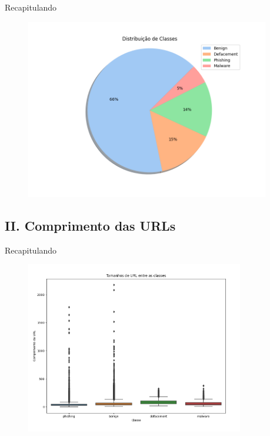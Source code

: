 \documentclass{beamer}
\begin{document}
\begin{frame}{Recapitulando}

    \begin{figure}[H]
        \centering
        \includegraphics[width=0.95\textwidth]{pic/Figure_1.png}
        \label{fig:exampleFig1}
    \end{figure}
    
\end{frame}

\subsection{II. Comprimento das URLs}

\begin{frame}{Recapitulando}

    \begin{figure}[H]
        \centering
        \includegraphics[width=0.85\textwidth]{pic/Figure_6.png}
        \label{fig:exampleFig2}
    \end{figure}
    
\end{frame}
\end{document}
